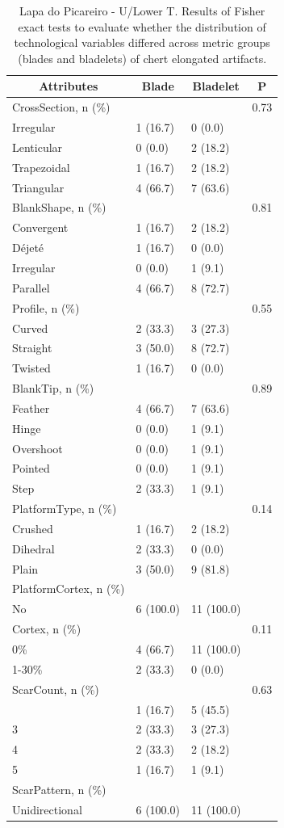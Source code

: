 \documentclass[12pt,twoside]{reedthesis}
\begin{document}
\begin{longtable}[t]{llll}
\caption{\label{tab:fisherelongLP1}Lapa do Picareiro - U/Lower T. Results of Fisher exact tests to evaluate whether the distribution of technological variables differed across metric groups (blades and bladelets) of chert elongated artifacts.}\\
\toprule
\multicolumn{1}{c}{\textbf{Attributes}} & \multicolumn{1}{c}{\textbf{Blade}} & \multicolumn{1}{c}{\textbf{Bladelet}} & \multicolumn{1}{c}{\textbf{P}}\\
\midrule
CrossSection, n (\%) &  &  & 0.73\\
Irregular & 1 (16.7) & 0 (0.0) & \\
Lenticular & 0 (0.0) & 2 (18.2) & \\
Trapezoidal & 1 (16.7) & 2 (18.2) & \\
Triangular & 4 (66.7) & 7 (63.6) & \\
\addlinespace
BlankShape, n (\%) &  &  & 0.81\\
Convergent & 1 (16.7) & 2 (18.2) & \\
Déjeté & 1 (16.7) & 0 (0.0) & \\
Irregular & 0 (0.0) & 1 (9.1) & \\
Parallel & 4 (66.7) & 8 (72.7) & \\
\addlinespace
Profile, n (\%) &  &  & 0.55\\
Curved & 2 (33.3) & 3 (27.3) & \\
Straight & 3 (50.0) & 8 (72.7) & \\
Twisted & 1 (16.7) & 0 (0.0) & \\
BlankTip, n (\%) &  &  & 0.89\\
\addlinespace
Feather & 4 (66.7) & 7 (63.6) & \\
Hinge & 0 (0.0) & 1 (9.1) & \\
Overshoot & 0 (0.0) & 1 (9.1) & \\
Pointed & 0 (0.0) & 1 (9.1) & \\
Step & 2 (33.3) & 1 (9.1) & \\
\addlinespace
PlatformType, n (\%) &  &  & 0.14\\
Crushed & 1 (16.7) & 2 (18.2) & \\
Dihedral & 2 (33.3) & 0 (0.0) & \\
Plain & 3 (50.0) & 9 (81.8) & \\
PlatformCortex, n (\%) &  &  & \\
\addlinespace
No & 6 (100.0) & 11 (100.0) & \\
Cortex, n (\%) &  &  & 0.11\\
0\% & 4 (66.7) & 11 (100.0) & \\
1-30\% & 2 (33.3) & 0 (0.0) & \\
ScarCount, n (\%) &  &  & 0.63\\
\addlinespace
2 & 1 (16.7) & 5 (45.5) & \\
3 & 2 (33.3) & 3 (27.3) & \\
4 & 2 (33.3) & 2 (18.2) & \\
5 & 1 (16.7) & 1 (9.1) & \\
ScarPattern, n (\%) &  &  & \\
\addlinespace
Unidirectional & 6 (100.0) & 11 (100.0) & \\
\bottomrule
\end{longtable}
\end{document}
